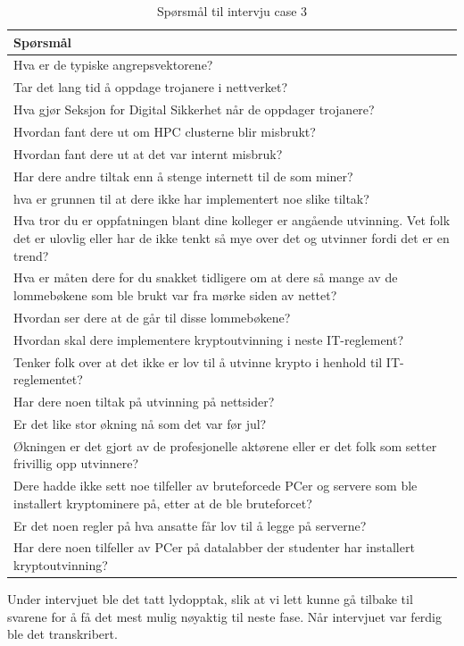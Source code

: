 \begin{table}[H]
    \centering
    \begin{tabular}{|m{30em}|} 
        \hline
             \cellcolor{yellow} Spørsmål  \\
        \hline
          Hva er de typiske angrepsvektorene?  \\
         \hline
         Tar det lang tid å oppdage trojanere i nettverket? \\ 
         \hline
         Hva gjør Seksjon for Digital Sikkerhet når de oppdager trojanere? \\
         \hline
         Hvordan fant dere ut om HPC clusterne blir misbrukt? \\
         \hline
         Hvordan fant dere ut at det var internt misbruk?\\
         \hline
         Har dere andre tiltak enn å stenge internett til de som miner? \\
         \hline
         hva er grunnen til at dere ikke har implementert noe slike tiltak? \\
         \hline
         Hva tror du er oppfatningen blant dine kolleger er angående utvinning. Vet folk det er ulovlig eller har de ikke tenkt så mye over det og utvinner fordi det er en trend? \\
         \hline
         Hva er måten dere for du snakket tidligere om at dere så mange av de lommebøkene som ble brukt var fra mørke siden av nettet?  \\
         \hline
         Hvordan ser dere at de går til disse lommebøkene? \\
         \hline
          Hvordan skal dere implementere kryptoutvinning i neste IT-reglement? \\
          \hline
          Tenker folk over at det ikke er lov til å utvinne krypto i henhold til IT-reglementet? \\
          \hline
          Har dere noen tiltak på utvinning på nettsider? \\
          \hline
          Er det like stor økning nå som det var før jul? \\
          \hline
          Økningen er det gjort av de profesjonelle aktørene eller er det folk som setter frivillig opp utvinnere? \\
          \hline
          Dere hadde ikke sett noe tilfeller av bruteforcede PCer og servere som ble installert kryptominere på, etter at de ble bruteforcet?  \\
          \hline
          Er det noen regler på hva ansatte får lov til å legge på serverne? \\
          \hline
          Har dere noen tilfeller av PCer på datalabber der studenter har installert kryptoutvinning?
          \hline
    \end{tabular}
    \caption{Spørsmål til intervju case 3}
    \label{tab:spm-intervju}
\end{table}
Under intervjuet ble det tatt lydopptak, slik at vi lett kunne gå tilbake til svarene for å få det mest mulig nøyaktig til neste fase. Når intervjuet var ferdig ble det transkribert.
